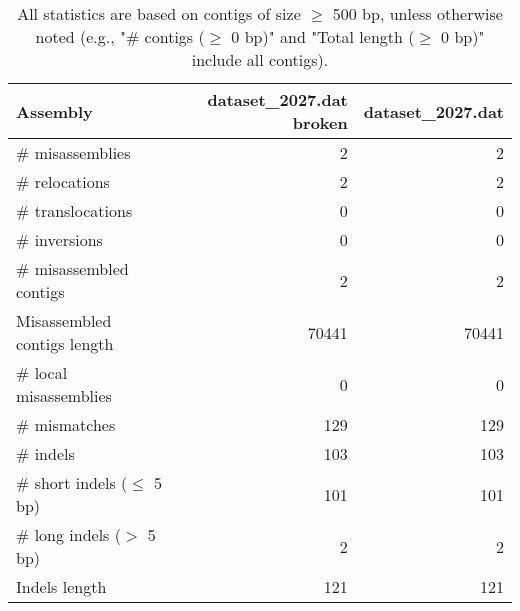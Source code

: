 \documentclass[12pt,a4paper]{article}
\begin{document}
\begin{table}[ht]
\begin{center}
\caption{All statistics are based on contigs of size $\geq$ 500 bp, unless otherwise noted (e.g., "\# contigs ($\geq$ 0 bp)" and "Total length ($\geq$ 0 bp)" include all contigs).}
\begin{tabular}{|l*{2}{|r}|}
\hline
Assembly & dataset\_2027.dat broken & dataset\_2027.dat \\ \hline
\# misassemblies & 2 & 2 \\ \hline
\hspace{5mm}\# relocations & 2 & 2 \\ \hline
\hspace{5mm}\# translocations & 0 & 0 \\ \hline
\hspace{5mm}\# inversions & 0 & 0 \\ \hline
\# misassembled contigs & 2 & 2 \\ \hline
Misassembled contigs length & 70441 & 70441 \\ \hline
\# local misassemblies & 0 & 0 \\ \hline
\# mismatches & 129 & 129 \\ \hline
\# indels & 103 & 103 \\ \hline
\hspace{5mm}\# short indels ($\leq$ 5 bp) & 101 & 101 \\ \hline
\hspace{5mm}\# long indels ($>$ 5 bp) & 2 & 2 \\ \hline
Indels length & 121 & 121 \\ \hline
\end{tabular}
\end{center}
\end{table}
\end{document}
